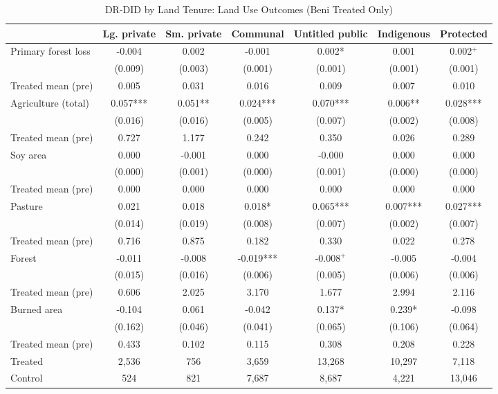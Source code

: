 \begin{table}[htbp]
\centering
\small
\caption{DR-DID by Land Tenure: Land Use Outcomes (Beni Treated Only)}
\label{tab:did_drdid_landuse_bydept_beni}
\begin{tabular}{lcccccc}
\toprule
 & Lg. private & Sm. private & Communal & Untitled public & Indigenous & Protected \\
\midrule
Primary forest loss & -0.004 & 0.002 & -0.001 & 0.002* & 0.001 & 0.002$^{+}$ \\
 & (0.009) & (0.003) & (0.001) & (0.001) & (0.001) & (0.001) \\
Treated mean (pre) & 0.005 & 0.031 & 0.016 & 0.009 & 0.007 & 0.010 \\
[0.5em]
Agriculture (total) & 0.057*** & 0.051** & 0.024*** & 0.070*** & 0.006** & 0.028*** \\
 & (0.016) & (0.016) & (0.005) & (0.007) & (0.002) & (0.008) \\
Treated mean (pre) & 0.727 & 1.177 & 0.242 & 0.350 & 0.026 & 0.289 \\
[0.5em]
Soy area & 0.000 & -0.001 & 0.000 & -0.000 & 0.000 & 0.000 \\
 & (0.000) & (0.001) & (0.000) & (0.001) & (0.000) & (0.000) \\
Treated mean (pre) & 0.000 & 0.000 & 0.000 & 0.000 & 0.000 & 0.000 \\
[0.5em]
Pasture & 0.021 & 0.018 & 0.018* & 0.065*** & 0.007*** & 0.027*** \\
 & (0.014) & (0.019) & (0.008) & (0.007) & (0.002) & (0.007) \\
Treated mean (pre) & 0.716 & 0.875 & 0.182 & 0.330 & 0.022 & 0.278 \\
[0.5em]
Forest & -0.011 & -0.008 & -0.019*** & -0.008$^{+}$ & -0.005 & -0.004 \\
 & (0.015) & (0.016) & (0.006) & (0.005) & (0.006) & (0.006) \\
Treated mean (pre) & 0.606 & 2.025 & 3.170 & 1.677 & 2.994 & 2.116 \\
[0.5em]
Burned area & -0.104 & 0.061 & -0.042 & 0.137* & 0.239* & -0.098 \\
 & (0.162) & (0.046) & (0.041) & (0.065) & (0.106) & (0.064) \\
Treated mean (pre) & 0.433 & 0.102 & 0.115 & 0.308 & 0.208 & 0.228 \\
\midrule
Treated & 2,536 & 756 & 3,659 & 13,268 & 10,297 & 7,118 \\
Control & 524 & 821 & 7,687 & 8,687 & 4,221 & 13,046 \\

\end{tabular}
\end{table}
